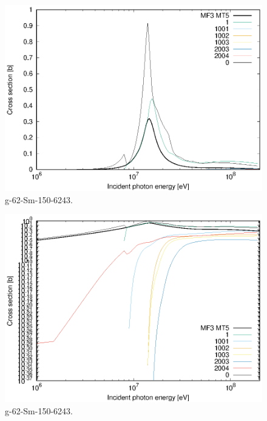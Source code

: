 \begin{figure}
 \includegraphics[width=\linewidth]{eps/g_62-Sm-150_6243.eps}
  \caption{g-62-Sm-150-6243.}
\end{figure}
\begin{figure}
 \includegraphics[width=\linewidth]{eps-log/g_62-Sm-150_6243.eps}
 \caption{g-62-Sm-150-6243.}
\end{figure}
\newpage \clearpage

